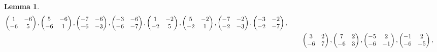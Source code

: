 \documentclass[12pt]{article}
\theoremstyle{definition}
\newtheorem{lemma}[theorem]{Lemma}
\numberwithin{equation}{section}
\numberwithin{theorem}{section}
\begin{document}
\begin{lemma}
{\begin{align*}
\begin{pmatrix}
1 & -6 \\
-6 & 5
\end{pmatrix}, 
\begin{pmatrix}
5 & -6 \\
-6 & 1
\end{pmatrix}, 
\begin{pmatrix}
-7 & -6 \\
-6 & -3
\end{pmatrix}, 
\begin{pmatrix}
-3 & -6 \\
-6 & -7
\end{pmatrix},  
\begin{pmatrix}
1 & -2 \\
-2 & 5
\end{pmatrix}, 
\begin{pmatrix}
5 & -2 \\
-2 & 1
\end{pmatrix}, 
\begin{pmatrix}
-7 & -2 \\
-2 & -3
\end{pmatrix}, 
\begin{pmatrix}
-3 & -2 \\
-2 & -7
\end{pmatrix},  \\
&\hspace{8mm}
\begin{pmatrix}
3 & 2 \\
-6 & 7
\end{pmatrix}, 
\begin{pmatrix}
7 & 2 \\
-6 & 3
\end{pmatrix}, 
\begin{pmatrix}
-5 & 2 \\
-6 & -1
\end{pmatrix}, 
\begin{pmatrix}
-1 & 2 \\
-6 & -5
\end{pmatrix}, 

\end{align*}}
\end{lemma}
\end{document}
